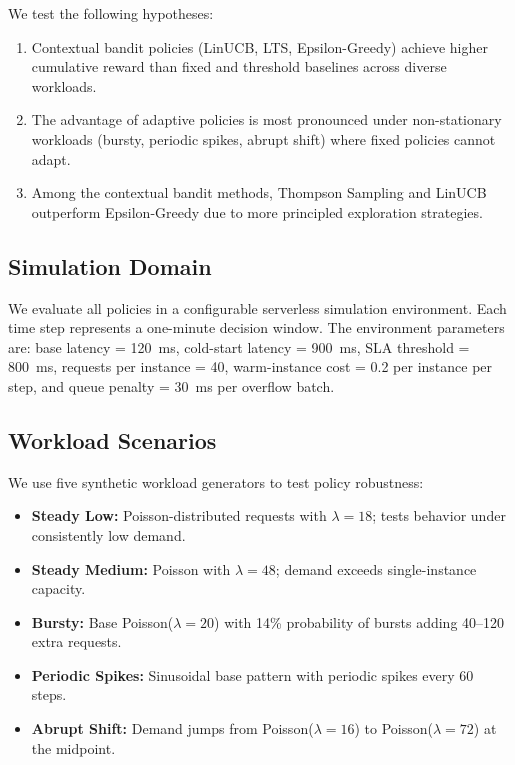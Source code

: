 \documentclass[11pt]{article}
\begin{document}
We test the following hypotheses:
\begin{enumerate}[nosep]
    \item[\textbf{H1:}] Contextual bandit policies (LinUCB, LTS, Epsilon-Greedy) achieve higher cumulative reward than fixed and threshold baselines across diverse workloads.
    \item[\textbf{H2:}] The advantage of adaptive policies is most pronounced under non-stationary workloads (bursty, periodic spikes, abrupt shift) where fixed policies cannot adapt.
    \item[\textbf{H3:}] Among the contextual bandit methods, Thompson Sampling and LinUCB outperform Epsilon-Greedy due to more principled exploration strategies.
\end{enumerate}

\subsection{Simulation Domain}

We evaluate all policies in a configurable serverless simulation environment. Each time step represents a one-minute decision window. The environment parameters are: base latency = 120~ms, cold-start latency = 900~ms, SLA threshold = 800~ms, requests per instance = 40, warm-instance cost = 0.2 per instance per step, and queue penalty = 30~ms per overflow batch.

\subsection{Workload Scenarios}

We use five synthetic workload generators to test policy robustness:
\begin{itemize}[nosep]
    \item \textbf{Steady Low:} Poisson-distributed requests with $\lambda = 18$; tests behavior under consistently low demand.
    \item \textbf{Steady Medium:} Poisson with $\lambda = 48$; demand exceeds single-instance capacity.
    \item \textbf{Bursty:} Base Poisson($\lambda=20$) with 14\% probability of bursts adding 40--120 extra requests.
    \item \textbf{Periodic Spikes:} Sinusoidal base pattern with periodic spikes every 60 steps.
    \item \textbf{Abrupt Shift:} Demand jumps from Poisson($\lambda=16$) to Poisson($\lambda=72$) at the midpoint.
\end{itemize}
\end{document}
